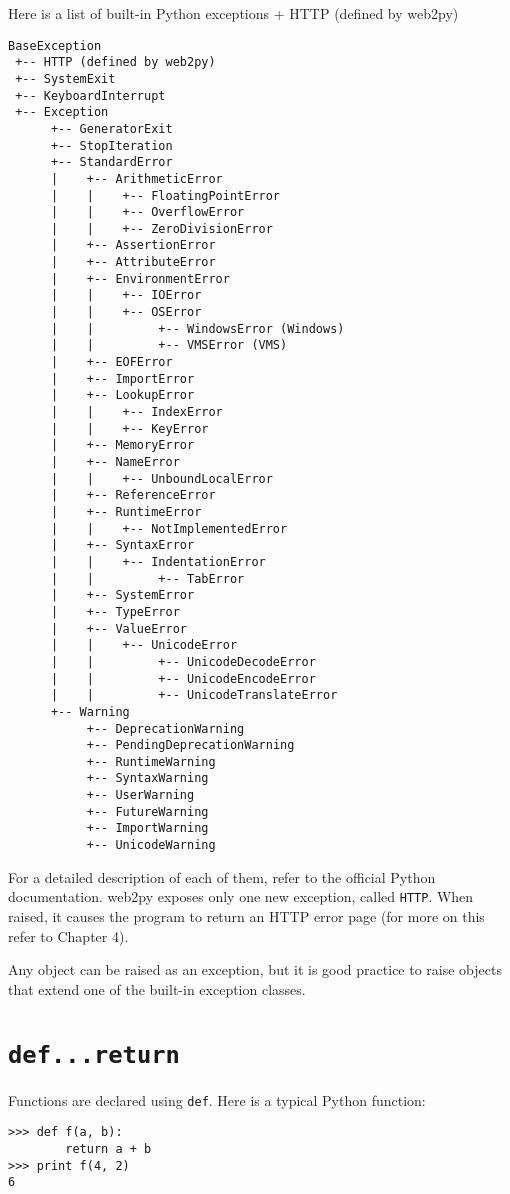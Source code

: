 \documentclass[justified,sixbynine,notoc]{tufte-book}
\def\ft{\small\tt}
\def\inxx#1{\index{#1}}
\begin{document}
\begin{fullwidth}
Here is a list of built-in Python exceptions + HTTP (defined by web2py)
\begin{lstlisting}
BaseException
 +-- HTTP (defined by web2py)
 +-- SystemExit
 +-- KeyboardInterrupt
 +-- Exception
      +-- GeneratorExit
      +-- StopIteration
      +-- StandardError
      |    +-- ArithmeticError
      |    |    +-- FloatingPointError
      |    |    +-- OverflowError
      |    |    +-- ZeroDivisionError
      |    +-- AssertionError
      |    +-- AttributeError
      |    +-- EnvironmentError
      |    |    +-- IOError
      |    |    +-- OSError
      |    |         +-- WindowsError (Windows)
      |    |         +-- VMSError (VMS)
      |    +-- EOFError
      |    +-- ImportError
      |    +-- LookupError
      |    |    +-- IndexError
      |    |    +-- KeyError
      |    +-- MemoryError
      |    +-- NameError
      |    |    +-- UnboundLocalError
      |    +-- ReferenceError
      |    +-- RuntimeError
      |    |    +-- NotImplementedError
      |    +-- SyntaxError
      |    |    +-- IndentationError
      |    |         +-- TabError
      |    +-- SystemError
      |    +-- TypeError
      |    +-- ValueError
      |    |    +-- UnicodeError
      |    |         +-- UnicodeDecodeError
      |    |         +-- UnicodeEncodeError
      |    |         +-- UnicodeTranslateError
      +-- Warning
           +-- DeprecationWarning
           +-- PendingDeprecationWarning
           +-- RuntimeWarning
           +-- SyntaxWarning
           +-- UserWarning
           +-- FutureWarning
           +-- ImportWarning
           +-- UnicodeWarning
\end{lstlisting}

For a detailed description of each of them, refer to the official Python documentation.
\noindent web2py exposes only one new exception, called {\ft HTTP}. When raised, it causes the program to return an HTTP error page (for more on this refer to Chapter 4).

Any object can be raised as an exception, but it is good practice to raise objects that extend one of the built-in exception classes.

\goodbreak\section{{\ft def...return}}

\inxx{def} \inxx{return}

Functions are declared using {\ft def}.  Here is a typical Python function:
\begin{lstlisting}
>>> def f(a, b):
        return a + b
>>> print f(4, 2)
6
\end{lstlisting}


\end{fullwidth}
\end{document}
